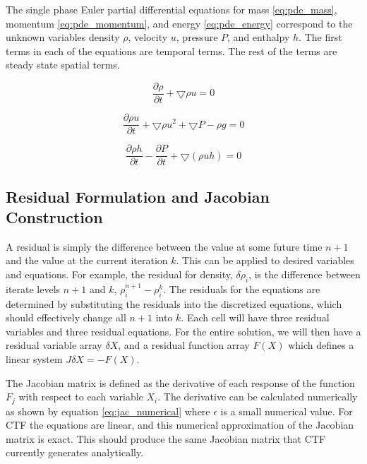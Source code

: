 \documentclass{mc2015}
\begin{document}
The single phase Euler partial differential equations for mass
\eqref{eq:pde_mass}, momentum \eqref{eq:pde_momentum}, and energy
\eqref{eq:pde_energy} correspond to the unknown variables density $\rho$,
velocity $u$, pressure $P$, and enthalpy $h$. The first terms in each of the
equations are temporal terms. The rest of the terms are steady state spatial
terms. 
    
    \begin{equation}
    	\label{eq:pde_mass}
    	\frac{ \partial \rho}{\partial t} + \bigtriangledown \rho u = 0
    \end{equation}
    
    \begin{equation}
    	\label{eq:pde_momentum}
    	\frac{ \partial \rho u}{\partial t} + \bigtriangledown \rho u^{2} +
    	\bigtriangledown P - \rho g  = 0
    \end{equation}
    
    \begin{equation}
    	\label{eq:pde_energy}
    	\frac{ \partial \rho h}{\partial t} -
    	\frac{ \partial  P}{\partial t} + 
    	\bigtriangledown ( \rho  u h )
    	= 0
    \end{equation}

\subsection{Residual Formulation and Jacobian Construction}

	A residual is simply the difference between the value at some future time
    $n+1$ and the value at the current iteration $k$. This can be applied to
    desired variables and equations. For example, the residual for density,
    $\delta \rho_{i}$, is the difference between iterate levels
    $n+1$ and $k$, $\rho^{n+1}_{i} - \rho^{k}_{i}$. The residuals for the
    equations are determined by substituting the residuals into the discretized
    equations, which should effectively change all $n+1$ into $k$. Each cell
    will have three residual variables and three residual equations. For the
    entire solution, we will then have a residual variable array $\delta X$, and
    a residual function array $F(X)$ which defines a linear system $J \delta X =
    - F(X)$.
    
    The Jacobian matrix is defined as the derivative
    of each response of the function $F_{j}$ with respect to each variable $X_{i}$.
    The derivative can be calculated numerically as shown by equation
    \eqref{eq:jac_numerical} where $\epsilon$ is a small numerical value. For
    CTF the equations are linear, and this numerical approximation
    of the Jacobian matrix is exact. This should produce the same Jacobian
    matrix that CTF currently generates analytically. 
    
\end{document}
